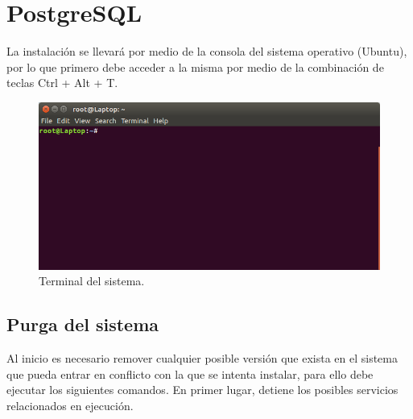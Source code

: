 

\lstset{style=mystyle}

\section{PostgreSQL}
La instalación se llevará por medio de la consola del sistema operativo (Ubuntu), por lo que primero debe acceder a la misma por medio de la combinación de teclas Ctrl + Alt + T.

\begin{figure}[H]
  \begin{center}
    \includegraphics[scale=0.35]{images/INST/1.png}
    \caption{Terminal del sistema.}
  \end{center}
\end{figure}

\subsection{Purga del sistema}

Al inicio es necesario remover cualquier posible versión que exista en el sistema que pueda entrar en conflicto con la que se intenta instalar, para ello debe ejecutar los siguientes comandos.
\bigbreak
En primer lugar, detiene los posibles servicios relacionados en ejecución.

